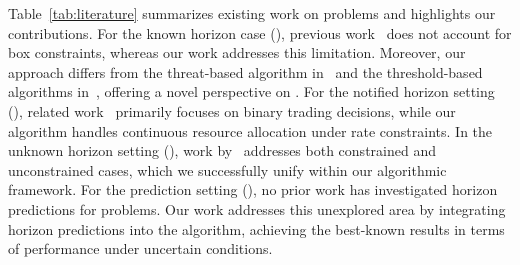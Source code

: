 Table~\ref{tab:literature} summarizes existing work on \OC problems and highlights our contributions. For the known horizon case (\OCK), previous work~\cite{time_series_search_2001} does not account for box constraints, whereas our work addresses this limitation. Moreover, our approach differs from the threat-based algorithm in~\cite{time_series_search_2001} and the threshold-based algorithms in~\cite{Sun_MultipleKnapsack_2020,k_search_2009}, offering a novel perspective on \OCK. For the notified horizon setting (\OCN), related work~\cite{k_search_2009,lechowicz2024online} primarily focuses on binary trading decisions, while our algorithm handles continuous resource allocation under rate constraints. In the unknown horizon setting (\OCU), work by~\cite{Sun_MultipleKnapsack_2020,lin2019competitive,tan2023threshold} addresses both constrained and unconstrained cases, which we successfully unify within our algorithmic framework. For the prediction setting (\OCP), no prior work has investigated horizon predictions for \OC problems. Our work addresses this unexplored area by integrating horizon predictions into the algorithm, achieving the best-known results in terms of performance under uncertain conditions.
